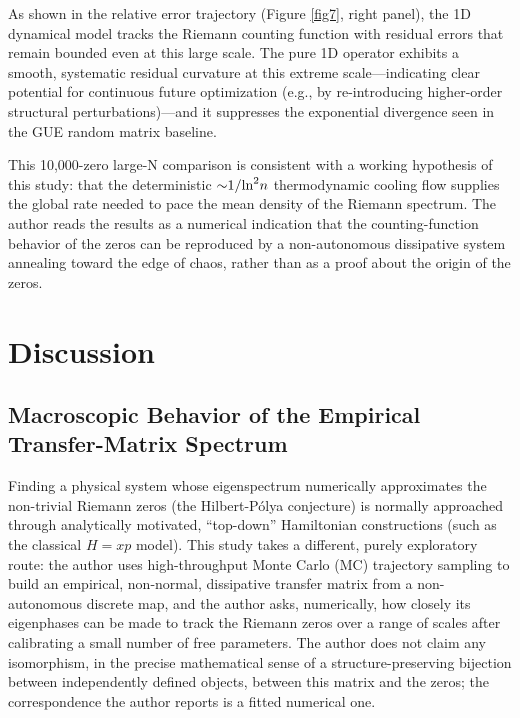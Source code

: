 \documentclass[mca,article,submit,oneauthor,pdftex]{Definitions/mdpi}
\begin{document}
As shown in the relative error trajectory (Figure \ref{fig7}, right panel), the
1D dynamical model tracks the Riemann counting function with residual errors
that remain bounded even at this large scale. The
pure 1D operator exhibits a smooth, systematic residual curvature at
this extreme scale---indicating clear potential for continuous future
optimization (e.g., by re-introducing higher-order structural
perturbations)---and it suppresses the exponential divergence
seen in the GUE random matrix baseline.

This 10,000-zero large-N comparison is consistent with a working
hypothesis of this study: that the deterministic
\(\text{\ensuremath{\sim}1/}\text{ln}^{\text{2}}{n}\) thermodynamic cooling flow
supplies the global rate needed to pace the mean density of the
Riemann spectrum. The author reads the results as a numerical indication that the
counting-function behavior of the zeros can be reproduced by a
non-autonomous dissipative system annealing toward the edge of chaos,
rather than as a proof about the origin of the zeros.

\section{Discussion}

\subsection{Macroscopic Behavior of the Empirical Transfer-Matrix Spectrum}\label{sec:rg-caveat}

Finding a physical system whose eigenspectrum numerically approximates the
non-trivial Riemann zeros (the Hilbert-P\'olya conjecture) is normally
approached through analytically motivated, ``top-down'' Hamiltonian
constructions (such as the classical \(H=xp\) model). This study takes a
different, purely exploratory route: the author uses high-throughput Monte Carlo
(MC) trajectory sampling to build an empirical, non-normal, dissipative
transfer matrix from a non-autonomous discrete map, and the author asks, numerically,
how closely its eigenphases can be made to track the Riemann zeros over a
range of scales after calibrating a small number of free parameters. The author does
not claim any isomorphism, in the precise mathematical sense of a
structure-preserving bijection between independently defined objects,
between this matrix and the zeros; the correspondence the author reports is a fitted
numerical one.
\end{document}
